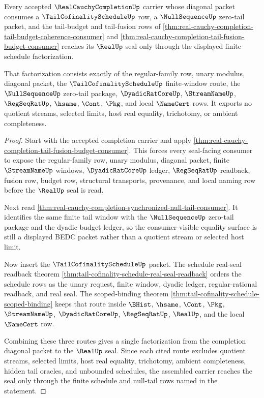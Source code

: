 \begin{theorem}
\label{thm:real-cauchy-completion-tail-cofinality-schedule-factorization}
Every accepted $\RealCauchyCompletionUp$ carrier whose diagonal packet consumes a $\TailCofinalityScheduleUp$ row, a $\NullSequenceUp$ zero-tail packet, and the tail-budget and tail-fusion rows of \autoref{thm:real-cauchy-completion-tail-budget-coherence-consumer} and \autoref{thm:real-cauchy-completion-tail-fusion-budget-consumer} reaches its $\RealUp$ seal only through the displayed finite schedule factorization.

That factorization consists exactly of the regular-family row, unary modulus, diagonal packet, the $\TailCofinalityScheduleUp$ finite-window route, the $\NullSequenceUp$ zero-tail package, $\DyadicRatCoreUp$, $\StreamNameUp$, $\RegSeqRatUp$, $\hsame$, $\Cont$, $\Pkg$, and local $\NameCert$ rows. It exports no quotient streams, selected limits, host real equality, trichotomy, or ambient completeness.
\end{theorem}
\begin{proof}
Start with the accepted completion carrier and apply \autoref{thm:real-cauchy-completion-tail-fusion-budget-consumer}. This forces every seal-facing consumer to expose the regular-family row, unary modulus, diagonal packet, finite $\StreamNameUp$ windows, $\DyadicRatCoreUp$ ledger, $\RegSeqRatUp$ readback, fusion row, budget row, structural transports, provenance, and local naming row before the $\RealUp$ seal is read.

Next read \autoref{thm:real-cauchy-completion-synchronized-null-tail-consumer}. It identifies the same finite tail window with the $\NullSequenceUp$ zero-tail package and the dyadic budget ledger, so the consumer-visible equality surface is still a displayed BEDC packet rather than a quotient stream or selected host limit.

Now insert the $\TailCofinalityScheduleUp$ packet. The schedule real-seal readback theorem \autoref{thm:tail-cofinality-schedule-real-seal-readback} orders the schedule rows as the unary request, finite window, dyadic ledger, regular-rational readback, and real seal. The scoped-binding theorem \autoref{thm:tail-cofinality-schedule-scoped-binding} keeps that route inside $\BHist$, $\hsame$, $\Cont$, $\Pkg$, $\StreamNameUp$, $\DyadicRatCoreUp$, $\RegSeqRatUp$, $\RealUp$, and the local $\NameCert$ row.

Combining these three routes gives a single factorization from the completion diagonal packet to the $\RealUp$ seal. Since each cited route excludes quotient streams, selected limits, host real equality, trichotomy, ambient completeness, hidden tail oracles, and unbounded schedules, the assembled carrier reaches the seal only through the finite schedule and null-tail rows named in the statement.
\end{proof}

